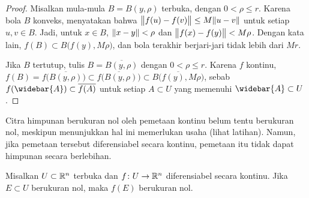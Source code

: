 \begin{proof}
Misalkan mula-mula $B=B(y,\rho)$ terbuka, dengan $0<\rho\leq r$. Karena bola
$B$ konveks,  menyatakan bahwa
$\bigl\lVert {f(u)-f(v)} \bigr\rVert\leq M\lVert {u-v} \rVert$ untuk setiap $u,v\in B$. Jadi, untuk
$x\in B$, $\lVert {x-y} \rVert<\rho$ dan $\bigl\lVert {f(x)-f(y)} \bigr\rVert<M\rho$. Dengan kata lain,
$f(B)\subset B\bigl(f(y),M\rho\bigr)$, dan bola terakhir berjari-jari tidak
lebih dari $Mr$.

Jika $B$ tertutup, tulis $B=\overline{B(y,\rho)}$ dengan $0<\rho\leq r$.
Karena $f$ kontinu,
$f(B)=f\bigl(\overline{B(y,\rho)}\bigr)\subset
\overline{f\bigl(B(y,\rho)\bigr)}\subset
\overline{B\bigl(f(y),M\rho\bigr)}$, sebab
$f(\widebar{A})\subset\overline{f(A)}$ untuk setiap $A\subset U$ yang memenuhi
$\widebar{A}\subset U$.
\end{proof}

Citra himpunan berukuran nol oleh pemetaan kontinu belum tentu berukuran nol,
meskipun menunjukkan hal ini memerlukan usaha (lihat latihan). Namun, jika
pemetaan tersebut diferensiabel secara kontinu, pemetaan itu tidak dapat
 himpunan secara berlebihan.

\begin{prop} \label{prop:imagenull}
Misalkan $U\subset{\mathbb{R}}^n$ terbuka dan $f\colon U\to{\mathbb{R}}^n$ diferensiabel secara
kontinu. Jika $E\subset U$ berukuran nol, maka $f(E)$ berukuran nol.
\end{prop}

